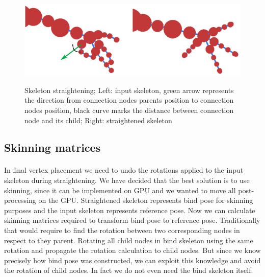 \begin{figure}[h]
    \centering
    \includegraphics[width=\textwidth]{images/straightening2.png}
    \label{fig:straightening_ilu}
    \caption[Skeleton straightening]{Skeleton straightening; Left: input skeleton, green arrow represents the direction from connection nodes parents position to connection nodes position, black curve marks the distance between connection node and its child; Right: straightened skeleton}
\end{figure}

\subsection{Skinning matrices}
\paragraph{}
In final vertex placement we need to undo the rotations applied to the input skeleton during straightening. We have decided that the best solution is to use skinning, since it can be implemented on GPU and we wanted to move all post-processing on the GPU. Straightened skeleton represents bind pose for skinning purposes and the input skeleton represents reference pose. Now we can calculate skinning matrices required to transform bind pose to reference pose. Traditionally that would require to find the rotation between two corresponding nodes in respect to they parent. Rotating all child nodes in bind skeleton using the same rotation and propagate the rotation calculation to child nodes. But since we know precisely how bind pose was constructed, we can exploit this knowledge and avoid the rotation of child nodes. In fact we do not even need the bind skeleton itself.


